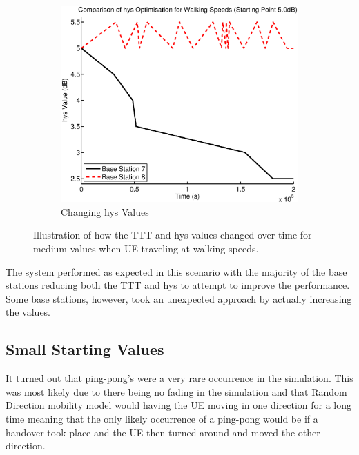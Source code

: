 \begin{figure}[H]
\begin{subfigure}[b]{0.49\textwidth}
                \includegraphics[width=\textwidth]{figures/walking_figures/mid/long_hys.eps}
                \caption{Changing hys Values}
                \label{fig:walk_mid_hys}
        \end{subfigure}
        \caption{Illustration of how the TTT and hys values changed over time for medium values when UE traveling at walking speeds.}\label{fig:walk_mid_ttthys}
\end{figure}
The system performed as expected in this scenario with the majority of the base stations reducing both the TTT and hys to attempt to improve the performance. Some base stations, however, took an unexpected approach by actually increasing the values.
\subsection{Small Starting Values}
It turned out that ping-pong's were a very rare occurrence in the simulation. This was most likely due to there being no fading in the simulation and that Random Direction mobility model would having the UE moving in one direction for a long time meaning that the only likely occurrence of a ping-pong would be if a handover took place and the UE then turned around and moved the other direction.

